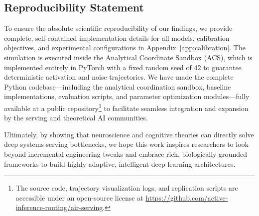 \subsection{Reproducibility Statement}
To ensure the absolute scientific reproducibility of our findings, we provide complete, self-contained implementation details for all models, calibration objectives, and experimental configurations in Appendix~\ref{app:calibration}. The simulation is executed inside the Analytical Coordinate Sandbox (ACS), which is implemented entirely in PyTorch with a fixed random seed of $42$ to guarantee deterministic activation and noise trajectories. We have made the complete Python codebase—including the analytical coordination sandbox, baseline implementations, evaluation scripts, and parameter optimization modules—fully available at a public repository\footnote{The source code, trajectory visualization logs, and replication scripts are accessible under an open-source license at \url{https://github.com/active-inference-routing/air-serving}.} to facilitate seamless integration and expansion by the serving and theoretical AI communities.

Ultimately, by showing that neuroscience and cognitive theories can directly solve deep systems-serving bottlenecks, we hope this work inspires researchers to look beyond incremental engineering tweaks and embrace rich, biologically-grounded frameworks to build highly adaptive, intelligent deep learning architectures.

